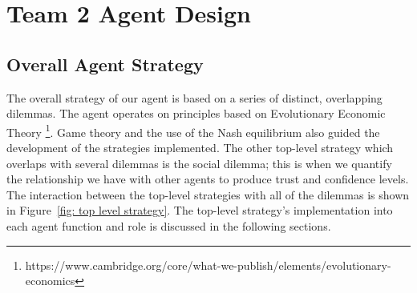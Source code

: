 \chapter{Team 2 Agent Design}
\section{Overall Agent Strategy}

The overall strategy of our agent is based on a series of distinct, overlapping dilemmas. The agent operates on principles based on Evolutionary Economic Theory \footnote{https://www.cambridge.org/core/what-we-publish/elements/evolutionary-economics}. Game theory and the use of the Nash equilibrium also guided the development of the strategies implemented. The other top-level strategy which overlaps with several dilemmas is the social dilemma; this is when we quantify the relationship we have with other agents to produce trust and confidence levels. The interaction between the top-level strategies with all of the dilemmas is shown in Figure~\ref{fig: top level strategy}. The top-level strategy's implementation into each agent function and role is discussed in the following sections. 

\begin{figure}[!htb]
    \centering
\end{figure}

